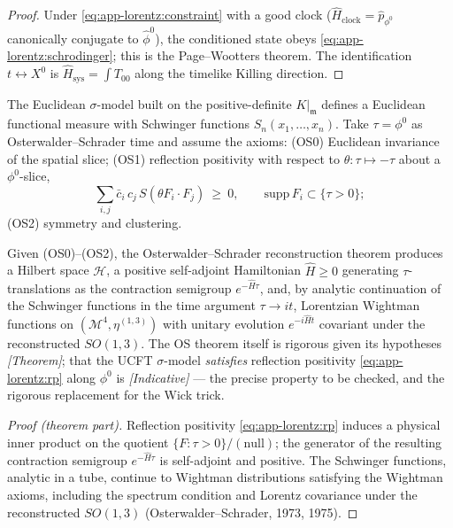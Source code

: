 \begin{proof}
Under \eqref{eq:app-lorentz:constraint} with a good clock
($\hat{H}_{\mathrm{clock}}=\hat{p}_{\phi^{0}}$ canonically conjugate to
$\hat{\phi}^{0}$), the conditioned state obeys \eqref{eq:app-lorentz:schrodinger};
this is the Page--Wootters theorem. The identification $t\leftrightarrow X^{0}$ is
$\hat{H}_{\mathrm{sys}}=\int T_{00}$ along the timelike Killing direction.
\end{proof}

\begin{construction}
\label{con:app-lorentz:OS}
The Euclidean $\sigma$-model built on the positive-definite $K|_{\mathfrak{m}}$
defines a Euclidean functional measure with Schwinger functions
$S_{n}(x_{1},\dots,x_{n})$. Take $\tau=\phi^{0}$ as Osterwalder--Schrader time and
assume the axioms: (OS0) Euclidean invariance of the spatial slice; (OS1) reflection
positivity with respect to $\theta:\tau\mapsto-\tau$ about a $\phi^{0}$-slice,
\begin{equation}
\label{eq:app-lorentz:rp}
\sum_{i,j}\bar{c}_{i}\,c_{j}\,S\!\left(\theta F_{i}\cdot F_{j}\right)\ \ge\ 0,
\qquad \mathrm{supp}\,F_{i}\subset\{\tau>0\};
\end{equation}
(OS2) symmetry and clustering.
\end{construction}

\begin{theorem}[OS reconstruction \texorpdfstring{$\Rightarrow$}{=>} Lorentzian Wightman theory]
\label{thm:app-lorentz:OS}
Given (OS0)--(OS2), the Osterwalder--Schrader reconstruction theorem produces a
Hilbert space $\mathcal{H}$, a positive self-adjoint Hamiltonian $\hat{H}\ge0$
generating $\tau$-translations as the contraction semigroup $e^{-\hat{H}\tau}$, and,
by analytic continuation of the Schwinger functions in the time argument
$\tau\to it$, Lorentzian Wightman functions on $(\mathcal{M}^{4},\eta^{(1,3)})$ with
unitary evolution $e^{-i\hat{H}t}$ covariant under the reconstructed $SO(1,3)$. The
OS theorem itself is rigorous given its hypotheses \emph{[Theorem]}; that the UCFT
$\sigma$-model \emph{satisfies} reflection positivity \eqref{eq:app-lorentz:rp} along
$\phi^{0}$ is \emph{[Indicative]} --- the precise property to be checked, and the
rigorous replacement for the Wick trick.
\end{theorem}

\begin{proof}[Proof (theorem part)]
Reflection positivity \eqref{eq:app-lorentz:rp} induces a physical inner product on
the quotient $\{F:\tau>0\}/(\text{null})$; the generator of the resulting contraction
semigroup $e^{-\hat{H}\tau}$ is self-adjoint and positive. The Schwinger functions,
analytic in a tube, continue to Wightman distributions satisfying the Wightman axioms,
including the spectrum condition and Lorentz covariance under the reconstructed
$SO(1,3)$ (Osterwalder--Schrader, 1973, 1975).
\end{proof}


